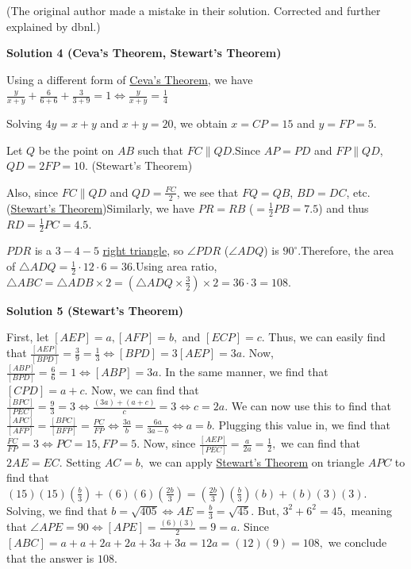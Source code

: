 \begin{enumerate}
 (The original author made a mistake in their solution. Corrected and further explained by dbnl.)

 



\textbf{Solution 4 (Ceva's Theorem, Stewart's Theorem)}

Using a different form of \href{https://artofproblemsolving.com/wiki/index.php?title=Ceva\%27s\_Theorem}{Ceva's Theorem}, we have $\frac {y}{x + y} + \frac {6}{6 + 6} + \frac {3}{3 + 9} = 1\Longleftrightarrow\frac {y}{x + y} = \frac {1}{4}$

 Solving $4y = x + y$ and $x + y = 20$, we obtain $x = CP = 15$ and $y = FP = 5$.

 Let $Q$ be the point on $AB$ such that $FC \parallel QD$.Since $AP = PD$ and $FP\parallel QD$, $QD = 2FP = 10$. (Stewart's Theorem)

 Also, since $FC\parallel QD$ and $QD = \frac{FC}{2}$, we see that $FQ = QB$, $BD = DC$, etc. (\href{https://artofproblemsolving.com/wiki/index.php?title=Stewart\%27s\_Theorem}{Stewart's Theorem})Similarly, we have $PR = RB$ ($= \frac12PB = 7.5$) and thus $RD = \frac12PC = 4.5$.

 $PDR$ is a $3-4-5$ \href{https://artofproblemsolving.com/wiki/index.php?title=Right\_triangle}{right triangle}, so $\angle PDR$ ($\angle ADQ$) is $90^\circ$.Therefore, the area of $\triangle ADQ = \frac12\cdot 12\cdot 6 = 36$.Using area ratio, $\triangle ABC = \triangle ADB\times 2 = \left(\triangle ADQ\times \frac32\right)\times 2 = 36\cdot 3 = \boxed{108}$.

 



\textbf{Solution 5 (Stewart's Theorem)}

First, let $[AEP]=a, [AFP]=b,$ and $[ECP]=c.$ Thus, we can easily find that $\frac{[AEP]}{[BPD]}=\frac{3}{9}=\frac{1}{3} \Leftrightarrow [BPD]=3[AEP]=3a.$ Now, $\frac{[ABP]}{[BPD]}=\frac{6}{6}=1\Leftrightarrow [ABP]=3a.$ In the same manner, we find that $[CPD]=a+c.$ Now, we can find that $\frac{[BPC]}{[PEC]}=\frac{9}{3}=3 \Leftrightarrow \frac{(3a)+(a+c)}{c}=3 \Leftrightarrow c=2a.$ We can now use this to find that $\frac{[APC]}{[AFP]}=\frac{[BPC]}{[BFP]}=\frac{PC}{FP} \Leftrightarrow \frac{3a}{b}=\frac{6a}{3a-b} \Leftrightarrow a=b.$ Plugging this value in, we find that $\frac{FC}{FP}=3 \Leftrightarrow PC=15, FP=5.$ Now, since $\frac{[AEP]}{[PEC]}=\frac{a}{2a}=\frac{1}{2},$ we can find that $2AE=EC.$ Setting $AC=b,$ we can apply \href{https://artofproblemsolving.com/wiki/index.php?title=Stewart\%27s\_Theorem}{Stewart's Theorem} on triangle $APC$ to find that $(15)(15)(\frac{b}{3})+(6)(6)(\frac{2b}{3})=(\frac{2b}{3})(\frac{b}{3})(b)+(b)(3)(3).$ Solving, we find that $b=\sqrt{405} \Leftrightarrow AE=\frac{b}{3}=\sqrt{45}.$ But, $3^2+6^2=45,$ meaning that $\angle{APE}=90 \Leftrightarrow [APE]=\frac{(6)(3)}{2}=9=a.$ Since $[ABC]=a+a+2a+2a+3a+3a=12a=(12)(9)=108,$ we conclude that the answer is $\boxed{108}$.


\end{enumerate}
